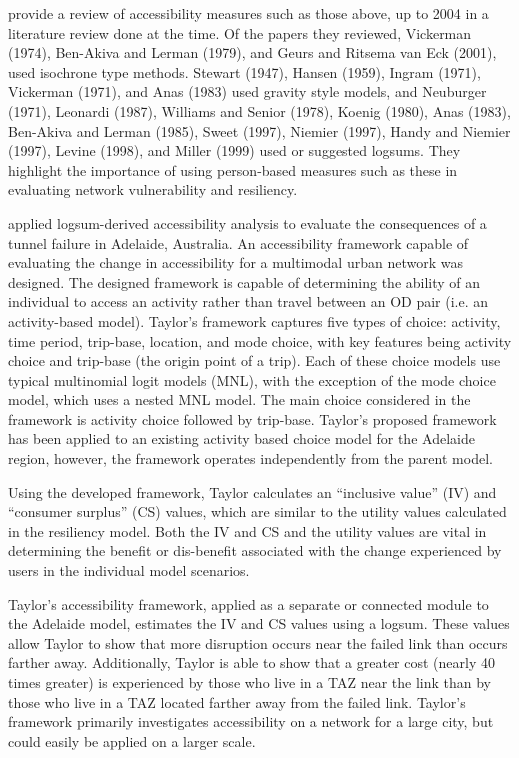 \citet{geurs2004} provide a review of accessibility measures such as those
above, up to
2004 in a literature review done at the time. Of the papers they reviewed,
Vickerman (1974), Ben-Akiva and Lerman
(1979), and Geurs and
Ritsema van Eck (2001), used isochrone type methods. Stewart (1947),
Hansen (1959), Ingram (1971), Vickerman (1971), and Anas (1983) used gravity
style models, and
Neuburger (1971), Leonardi (1987),
Williams and Senior (1978), Koenig (1980), Anas (1983), Ben-Akiva and Lerman
(1985), Sweet
(1997), Niemier (1997), Handy and Niemier (1997), Levine (1998), and Miller
(1999) used or
suggested logsums. They highlight the importance of using person-based
measures such as these in
evaluating network vulnerability and resiliency.

\citet{taylor2008} applied logsum-derived accessibility analysis to
evaluate the consequences of a tunnel failure in Adelaide, Australia. An
accessibility framework capable of evaluating the change in accessibility
for a multimodal urban network was designed. The designed framework is
capable of determining the ability of an individual to access an activity
rather than travel between an OD pair (i.e. an activity-based model).
Taylor's framework captures five types of choice: activity, time period,
trip-base, location, and mode choice, with key features being activity
choice and trip-base (the origin point of a trip). Each of these choice
models use typical multinomial logit models (MNL), with the exception of
the mode choice model, which uses a nested MNL model. The main choice
considered in the framework is activity choice followed by trip-base.
Taylor's proposed framework has been applied to an existing activity based
choice model for the Adelaide region, however, the framework operates
independently from the parent model.

Using the developed framework, Taylor calculates an ``inclusive value'' (IV)
and ``consumer surplus'' (CS) values, which are similar to the utility
values calculated in the resiliency model. Both the IV and CS and the
utility values are vital in determining the benefit or dis-benefit
associated with the change experienced by users in the individual model
scenarios.

Taylor's accessibility framework, applied as a separate or connected module to
the Adelaide model, estimates the IV and CS values using a logsum.
These values allow Taylor to show that more disruption occurs near the
failed link than occurs farther away. Additionally, Taylor is able to show
that a greater cost (nearly 40 times greater) is experienced by those who
live in a TAZ near the link than by those who live in a TAZ located
farther away from the failed link. Taylor's framework primarily
investigates accessibility on a network for a large city,
but could easily be applied on a larger scale.


